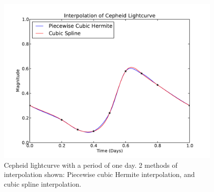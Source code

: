 \documentclass{article}
\begin{document}
\begin{figure}[h]
  \begin{center}
     \includegraphics[width=\textwidth]{ceph2}
  \end{center}
  \caption{Cepheid lightcurve with a period of one day.  2 methods of interpolation
	   shown: Piecewise cubic Hermite interpolation, and cubic spline interpolation.}
  \label{fig:ceph2}
\end{figure}
\end{document}
